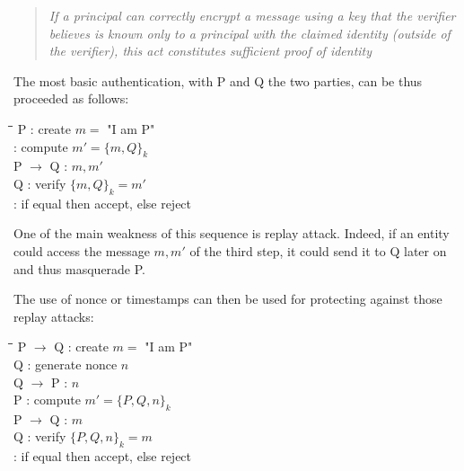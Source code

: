 \begin{quote}
	\textit{If a principal can correctly encrypt a message using a key that the verifier believes is known
	only to a principal with the claimed identity (outside of the verifier), this act constitutes sufficient proof of identity}
\end{quote}

The most basic authentication, with P and Q the two parties, can be thus proceeded as follows:

\begin{tabbing}
	\hspace{4em}\=\hspace{4em}\=\hspace{2em}\=\kill
	\>  P \>  : \> create $m =$ "I am P" \\
	\>    \>  : \> compute $m' = \lbrace m, Q \rbrace_{k}$ 				\\
	\>  P $\rightarrow$ Q \>  : \> $m,m'$ \\
	\>  Q \>  : \> verify $\lbrace m, Q \rbrace_{k} = m'$ \\
		\>    \>  : \> if equal then accept, else reject \\
\end{tabbing} 

One of the main weakness of this sequence is replay attack. Indeed, if an entity could access the message $m,m'$ of the third step, it could send it to Q later on and thus masquerade P.

The use of nonce or timestamps can then be used for protecting against those replay attacks:

\begin{tabbing}
	\hspace{4em}\=\hspace{4em}\=\hspace{2em}\=\kill
	\>  P $\rightarrow$ Q\>  : \> create $m =$ "I am P" \\
	\>  Q  \>  : \> generate nonce $n$	\\
	\>  Q $\rightarrow$ P \>  : \> $n$ \\
	\>  P  \>  : \> compute $m' = \lbrace P, Q, n \rbrace_{k}$ 				\\
	\>  P $\rightarrow$ Q \>  : \> $m$ \\
	\>  Q \>  : \> verify $\lbrace P, Q, n \rbrace_{k} = m$ \\
	\>    \>  : \> if equal then accept, else reject \\
\end{tabbing} 

